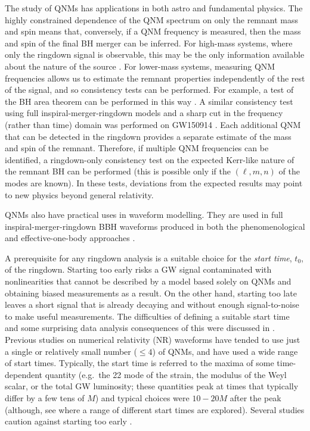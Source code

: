 The study of QNMs has applications in both astro and fundamental physics. 
The highly constrained dependence of the QNM spectrum on only the remnant mass and spin means that, conversely, if a QNM frequency is measured, then the mass and spin of the final BH merger can be inferred. 
For high-mass systems, where only the ringdown signal is observable, this may be the only information available about the nature of the source \cite{Berti:2005ys, Baibhav:2020tma}. 
For lower-mass systems, measuring QNM frequencies allows us to estimate the remnant properties independently of the rest of the signal, and so consistency tests can be performed. 
For example, a test of the BH area theorem can be performed in this way \cite{Cabero:2017avf, Isi:2020tac}. 
A similar consistency test using full inspiral-merger-ringdown models and a sharp cut in the frequency (rather than time) domain was performed on GW150914 \cite{LIGOScientific:2016lio}. 
Each additional QNM that can be detected in the ringdown provides a separate estimate of the mass and spin of the remnant. 
Therefore, if multiple QNM frequencies can be identified, a ringdown-only consistency test on the expected Kerr-like nature of the remnant BH can be performed \cite{Dreyer:2003bv, Carullo:2019flw} (this is possible only if the $(\ell, m, n)$ of the modes are known). 
In these tests, deviations from the expected results may point to new physics beyond general relativity. 

QNMs also have practical uses in waveform modelling.
They are used in full inspiral-merger-ringdown BBH waveforms produced in both the phenomenological \cite{Pratten:2020ceb, Garcia-Quiros:2020qpx, Pratten:2020fqn} and effective-one-body approaches \cite{Buonanno:2006ui, Buonanno:2007pf, Pan:2011gk}.

A prerequisite for any ringdown analysis is a suitable choice for the \emph{start time}, $t_0$, of the ringdown. 
Starting too early risks a GW signal contaminated with nonlinearities that cannot be described by a model based solely on QNMs and obtaining biased measurements as a result. 
On the other hand, starting too late leaves a short signal that is already decaying and without enough signal-to-noise to make useful measurements. 
The difficulties of defining a suitable start time and some surprising data analysis consequences of this were discussed in \cite{Thrane:2017lqn}. 
Previous studies on numerical relativity (NR) waveforms have tended to use just a single \cite{Flanagan:1997sx} or relatively small number ($\leq 4$) \cite{Kamaretsos:2011um, London:2014cma, Carullo:2018sfu, Bhagwat:2017tkm} of QNMs, and have used a wide range of start times. 
Typically, the start time is referred to the maxima of some time-dependent quantity (e.g.\ the 22 mode of the strain, the modulus of the Weyl scalar, or the total GW luminosity; these quantities peak at times that typically differ by a few tens of $M$) and typical choices were ${10-20M}$ after the peak (although, see \cite{Berti:2007fi} where a range of different start times are explored). 
Several studies caution against starting too early \cite{JimenezForteza:2020cve, Bhagwat:2019dtm}.

